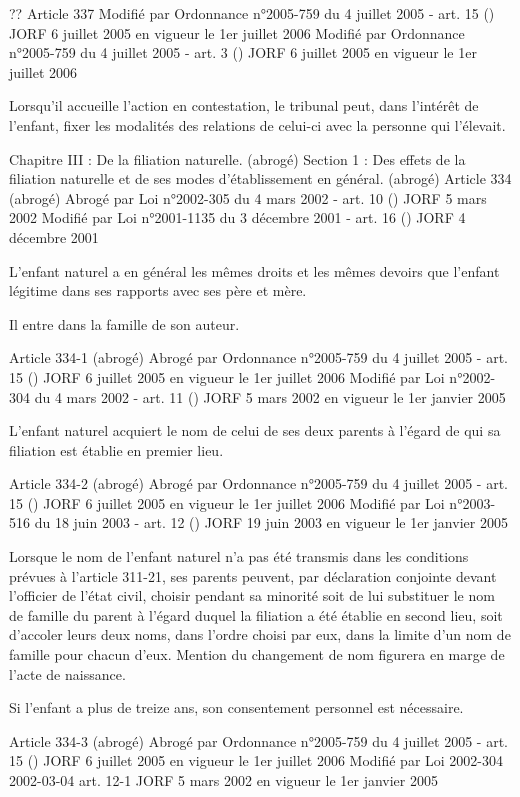 \documentclass[
  12pt,
]{book}
\begin{document}
\begin{encadre}{??}
Article 337
Modifié par Ordonnance n°2005-759 du 4 juillet 2005 - art. 15 () JORF 6 juillet 2005 en vigueur le 1er juillet 2006
Modifié par Ordonnance n°2005-759 du 4 juillet 2005 - art. 3 () JORF 6 juillet 2005 en vigueur le 1er juillet 2006

Lorsqu'il accueille l'action en contestation, le tribunal peut, dans l'intérêt de l'enfant, fixer les modalités des relations de celui-ci avec la personne qui l'élevait.

Chapitre III : De la filiation naturelle. (abrogé)
Section 1 : Des effets de la filiation naturelle et de ses modes d'établissement en général. (abrogé)
Article 334 (abrogé)
Abrogé par Loi n°2002-305 du 4 mars 2002 - art. 10 () JORF 5 mars 2002
Modifié par Loi n°2001-1135 du 3 décembre 2001 - art. 16 () JORF 4 décembre 2001

L'enfant naturel a en général les mêmes droits et les mêmes devoirs que l'enfant légitime dans ses rapports avec ses père et mère.

Il entre dans la famille de son auteur.

Article 334-1 (abrogé)
Abrogé par Ordonnance n°2005-759 du 4 juillet 2005 - art. 15 () JORF 6 juillet 2005 en vigueur le 1er juillet 2006
Modifié par Loi n°2002-304 du 4 mars 2002 - art. 11 () JORF 5 mars 2002 en vigueur le 1er janvier 2005

L'enfant naturel acquiert le nom de celui de ses deux parents à l'égard de qui sa filiation est établie en premier lieu.

Article 334-2 (abrogé)
Abrogé par Ordonnance n°2005-759 du 4 juillet 2005 - art. 15 () JORF 6 juillet 2005 en vigueur le 1er juillet 2006
Modifié par Loi n°2003-516 du 18 juin 2003 - art. 12 () JORF 19 juin 2003 en vigueur le 1er janvier 2005

Lorsque le nom de l'enfant naturel n'a pas été transmis dans les conditions prévues à l'article 311-21, ses parents peuvent, par déclaration conjointe devant l'officier de l'état civil, choisir pendant sa minorité soit de lui substituer le nom de famille du parent à l'égard duquel la filiation a été établie en second lieu, soit d'accoler leurs deux noms, dans l'ordre choisi par eux, dans la limite d'un nom de famille pour chacun d'eux. Mention du changement de nom figurera en marge de l'acte de naissance.

Si l'enfant a plus de treize ans, son consentement personnel est nécessaire.

Article 334-3 (abrogé)
Abrogé par Ordonnance n°2005-759 du 4 juillet 2005 - art. 15 () JORF 6 juillet 2005 en vigueur le 1er juillet 2006
Modifié par Loi 2002-304 2002-03-04 art. 12-1 JORF 5 mars 2002 en vigueur le 1er janvier 2005


\end{encadre}
\end{document}
